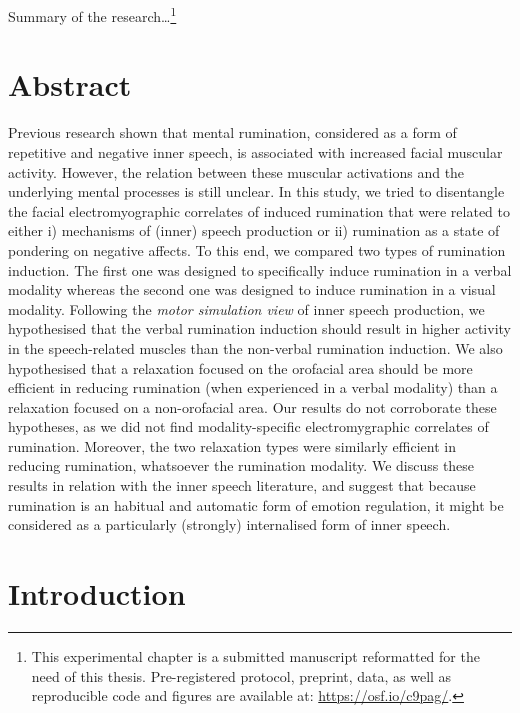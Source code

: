 \documentclass[a4paper,12pt,twoside,openright,oldfontcommands]{memoir}
\let\rmarkdownfootnote\footnote%
\def\footnote{\protect\rmarkdownfootnote}
\begin{document}
Summary of the research\ldots{}\footnote{This experimental chapter is a submitted manuscript reformatted for the need of this thesis. Pre-registered protocol, preprint, data, as well as reproducible code and figures are available at: \url{https://osf.io/c9pag/}.}

\hypertarget{abstract-1}{%
\section{Abstract}\label{abstract-1}}

Previous research shown that mental rumination, considered as a form of repetitive and negative inner speech, is associated with increased facial muscular activity. However, the relation between these muscular activations and the underlying mental processes is still unclear. In this study, we tried to disentangle the facial electromyographic correlates of induced rumination that were related to either i) mechanisms of (inner) speech production or ii) rumination as a state of pondering on negative affects. To this end, we compared two types of rumination induction. The first one was designed to specifically induce rumination in a verbal modality whereas the second one was designed to induce rumination in a visual modality. Following the \emph{motor simulation view} of inner speech production, we hypothesised that the verbal rumination induction should result in higher activity in the speech-related muscles than the non-verbal rumination induction. We also hypothesised that a relaxation focused on the orofacial area should be more efficient in reducing rumination (when experienced in a verbal modality) than a relaxation focused on a non-orofacial area. Our results do not corroborate these hypotheses, as we did not find modality-specific electromygraphic correlates of rumination. Moreover, the two relaxation types were similarly efficient in reducing rumination, whatsoever the rumination modality. We discuss these results in relation with the inner speech literature, and suggest that because rumination is an habitual and automatic form of emotion regulation, it might be considered as a particularly (strongly) internalised form of inner speech.

\hypertarget{introduction-1}{%
\section{Introduction}\label{introduction-1}}
\end{document}
